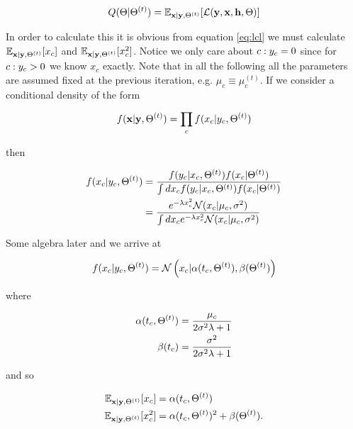 \begin{equation}
Q(\Theta|\Theta^{(t)}) = \mathbb{E}_{{\bf x} | {\bf y}, \Theta^{(t)}} [\mathcal{L}({\bf y}, {\bf x}, {\bf h}, \Theta)]
\end{equation}

In order to calculate this it is obvious from equation \ref{eq:lcl} we must calculate $\mathbb{E}_{{\bf x} | {\bf y}, \Theta^{(t)}} [ x_c ]$ and $\mathbb{E}_{{\bf x} | {\bf y}, \Theta^{(t)}} [ x_c^2 ]$. Notice we only care about ${c: y_c = 0}$ since for ${c: y_c > 0}$ we know $x_c$ exactly. Note that in all the following all the parameters are assumed fixed at the previous iteration, e.g. $\mu_c \equiv \mu_c^{(t)}$. If we consider a conditional density of the form

\begin{equation}
f({\bf x} | {\bf y}, \Theta^{(t)}) = \prod_c f(x_c | y_c, \Theta^{(t)})
\end{equation}

then

\begin{equation}
\begin{aligned}
f(x_c | y_c, \Theta^{(t)}) & = \frac{f(y_c | x_c, \Theta^{(t)})f(x_c | \Theta^{(t)})}{\int dx_c f(y_c | x_c, \Theta^{(t)})f(x_c | \Theta^{(t)})} \\
& = \frac{e^{-\lambda x_c^2} \mathcal{N}(x_c | \mu_c, \sigma^2)}{\int dx_c e^{-\lambda x_c^2} \mathcal{N}(x_c | \mu_c, \sigma^2)}
\end{aligned}
\end{equation}


Some algebra later and we arrive at

\begin{equation}
f(x_c | y_c, \Theta^{(t)}) = \mathcal{N}\left(x_c | \alpha(t_c, \Theta^{(t)}), \beta(\Theta^{(t)}) \right)
\end{equation}

where

\begin{equation}
\begin{aligned}
\alpha(t_c, \Theta^{(t)}) & = \frac{\mu_c}{2 \sigma^2 \lambda + 1} \\
\beta(t_c) & = \frac{\sigma^2}{2 \sigma^2 \lambda + 1}
\end{aligned}
\end{equation}

and so

\begin{equation}
\begin{aligned}
\mathbb{E}_{{\bf x} | {\bf y}, \Theta^{(t)}} [ x_c ] &= \alpha(t_c, \Theta^{(t)})  \\
\mathbb{E}_{{\bf x} | {\bf y}, \Theta^{(t)}} [ x_c^2  ] &= \alpha(t_c, \Theta^{(t)})^2 + \beta(\Theta^{(t)}).
\end{aligned}
\end{equation}

